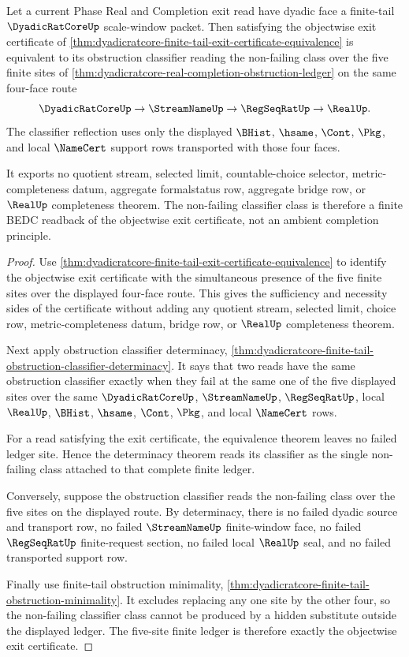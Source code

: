 \begin{theorem}
\label{thm:dyadicratcore-finite-tail-exit-certificate-classifier-reflection}
Let a current Phase Real and Completion exit read have dyadic face a finite-tail $\DyadicRatCoreUp$ scale-window packet. Then satisfying the objectwise exit certificate of \autoref{thm:dyadicratcore-finite-tail-exit-certificate-equivalence} is equivalent to its obstruction classifier reading the non-failing class over the five finite sites of \autoref{thm:dyadicratcore-real-completion-obstruction-ledger} on the same four-face route
$$
\DyadicRatCoreUp \to \StreamNameUp \to \RegSeqRatUp \to \RealUp.
$$
The classifier reflection uses only the displayed $\BHist$, $\hsame$, $\Cont$, $\Pkg$, and local $\NameCert$ support rows transported with those four faces.

It exports no quotient stream, selected limit, countable-choice selector, metric-completeness datum, aggregate formalstatus row, aggregate bridge row, or $\RealUp$ completeness theorem. The non-failing classifier class is therefore a finite BEDC readback of the objectwise exit certificate, not an ambient completion principle.
\end{theorem}
\begin{proof}
Use \autoref{thm:dyadicratcore-finite-tail-exit-certificate-equivalence} to identify the objectwise exit certificate with the simultaneous presence of the five finite sites over the displayed four-face route. This gives the sufficiency and necessity sides of the certificate without adding any quotient stream, selected limit, choice row, metric-completeness datum, bridge row, or $\RealUp$ completeness theorem.

Next apply obstruction classifier determinacy, \autoref{thm:dyadicratcore-finite-tail-obstruction-classifier-determinacy}. It says that two reads have the same obstruction classifier exactly when they fail at the same one of the five displayed sites over the same $\DyadicRatCoreUp$, $\StreamNameUp$, $\RegSeqRatUp$, local $\RealUp$, $\BHist$, $\hsame$, $\Cont$, $\Pkg$, and local $\NameCert$ rows.

For a read satisfying the exit certificate, the equivalence theorem leaves no failed ledger site. Hence the determinacy theorem reads its classifier as the single non-failing class attached to that complete finite ledger.

Conversely, suppose the obstruction classifier reads the non-failing class over the five sites on the displayed route. By determinacy, there is no failed dyadic source and transport row, no failed $\StreamNameUp$ finite-window face, no failed $\RegSeqRatUp$ finite-request section, no failed local $\RealUp$ seal, and no failed transported support row.

Finally use finite-tail obstruction minimality, \autoref{thm:dyadicratcore-finite-tail-obstruction-minimality}. It excludes replacing any one site by the other four, so the non-failing classifier class cannot be produced by a hidden substitute outside the displayed ledger. The five-site finite ledger is therefore exactly the objectwise exit certificate.
\end{proof}

